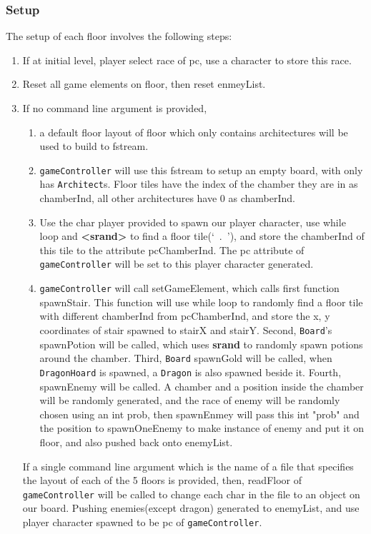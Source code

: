 \documentclass[11pt]{article}
\theoremstyle{plain} \newtheorem{theorem*}{Theorem}[subsection]
\begin{document}
\subsubsection{Setup}
The setup of each floor involves the following steps:
\begin{enumerate}[leftmargin=*]%
\item If at initial level, player select race of pc, 
	use a character to store this race.
\item Reset all game elements on \textsf{floor}, then reset \textsf{enmeyList}.
\item 
If no command line argument is provided, 
\begin{enumerate}[leftmargin=*, noitemsep, label=(\roman*)]
\item 
a default floor layout of floor which
only contains architectures will be used to build to fstream.
\item
\texttt{gameController} will use this fstream to setup an empty board, with
only has \texttt{Architect}s. Floor tiles have the index of the chamber they 
are in as \textsf{chamberInd}, all other architectures have 0 as 
\textsf{chamberInd}. 
\item
Use the char player provided to spawn our player character, 
use while loop and \textbf{<srand>} to find a floor tile(`\ .\ '), 
and store the \textsf{chamberInd} of this tile to 
the attribute \textsf{pcChamberInd}. The \textsf{pc} attribute of 
\texttt{gameController} will be set to this player character generated.
\item
\texttt{gameController} will call \textsf{setGameElement}, which calls first
function \textsf{spawnStair}. This function will use while loop to randomly
find a floor tile with different \textsf{chamberInd} from \textsf{pcChamberInd},
and store the x, y coordinates of stair spawned to \textsf{stairX} and 
\textsf{stairY}.
Second, \texttt{Board}'s \textsf{spawnPotion} will be called, which
uses \textbf{srand} to randomly spawn potions around the chamber.
Third, \texttt{Board} \textsf{spawnGold} will be called, when
\texttt{DragonHoard} is spawned, a \texttt{Dragon} is also spawned beside it.
Fourth, \textsf{spawnEnemy} will be called. A chamber and a position inside the
chamber will be randomly generated, and the race of enemy will be randomly
chosen using an int prob, then \textsf{spawnEnmey} will pass this int "prob"
and the position to \textsf{spawnOneEnemy} to make instance of enemy and 
put it on \textsf{floor}, and also pushed back onto \textsf{enemyList}.

\end{enumerate}

If a single command line argument which is the name of a file that specifies
the layout of each of the 5 floors is provided, then, \textsf{readFloor} of
\texttt{gameController} will be called to change each char in the file to an
object on our board. 
Pushing enemies(except dragon) generated to \textsf{enemyList}, and 
use player character spawned to be \textsf{pc} of \texttt{gameController}.

\end{enumerate}
\end{document}
